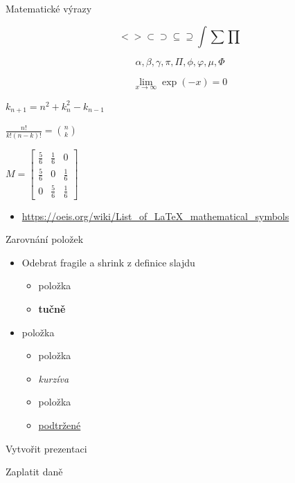\documentclass{beamer}							%
\begin{document}
\begin{frame}[fragile, shrink=0]{Matematické výrazy}

\begin{equation}
		< > \subset \supset \subseteq \supseteq \int \sum \prod
\end{equation}

	$$ \alpha, \beta, \gamma, \pi, \Pi, \phi, \varphi, \mu, \Phi $$
	
	$$\lim\limits_{x \to \infty} \exp(-x) = 0$$
	
	$k_{n+1} = n^2 + k_n^2 - k_{n-1}$ 
	
	\begin{math}
	\frac{n!}{k!(n-k)!} = \binom{n}{k}
	\end{math}
	

	$M = \begin{bmatrix}
       \frac{5}{6} & \frac{1}{6} & 0           \\[0.3em]
       \frac{5}{6} & 0           & \frac{1}{6} \\[0.3em]
       0           & \frac{5}{6} & \frac{1}{6}
     \end{bmatrix}$


\begin{itemize}
	\item 	\url{https://oeis.org/wiki/List_of_LaTeX_mathematical_symbols}
\end{itemize}
	
\end{frame}
\begin{frame}{Zarovnání položek}
	\begin{itemize}
		\item Odebrat fragile a shrink z definice slajdu
		      \begin{itemize}
			      \item položka
			      \item \textbf{tučně}
		      \end{itemize}
		\item položka
		      \begin{itemize}
			      \item položka
			      \item \emph{kurzíva}
			      \item položka
			      \item \underline{podtržené}
		      \end{itemize}
	\end{itemize}
	
	\cmark   Vytvořit prezentaci 

\xmark   Zaplatit daně 
\end{frame}
\end{document}
